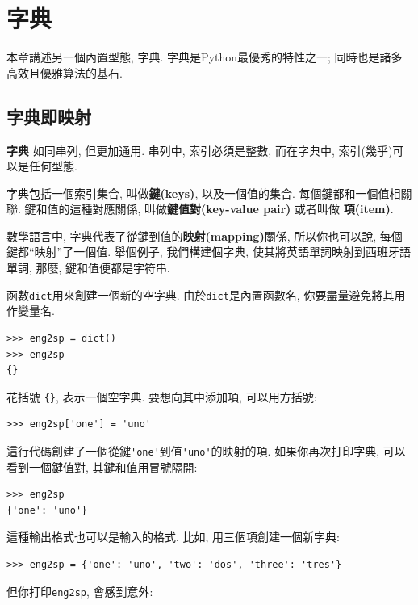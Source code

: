 \documentclass[10pt]{book}
\begin{document}
\chapter{字典}

本章講述另一個內置型態, 字典. 
字典是Python最優秀的特性之一; 同時也是諸多高效且優雅算法的基石. 


\section{字典即映射}


 {\bf 字典} 如同串列, 但更加通用. 串列中, 索引必須是整數, 
而在字典中, 索引(幾乎)可以是任何型態. 

字典包括一個索引集合, 叫做{\bf 鍵(keys)}, 以及一個值的集合. 
每個鍵都和一個值相關聯. 鍵和值的這種對應關係, 叫做{\bf 鍵值對(key-value pair)}
或者叫做 {\bf 項(item)}.  

數學語言中, 字典代表了從鍵到值的{\bf 映射(mapping)}關係, 
所以你也可以說, 每個鍵都``映射''了一個值. 
舉個例子, 我們構建個字典, 使其將英語單詞映射到西班牙語單詞, 
那麼, 鍵和值便都是字符串. 

函數{\tt dict}用來創建一個新的空字典. 
由於{\tt dict}是內置函數名, 你要盡量避免將其用作變量名. 

\begin{verbatim}
>>> eng2sp = dict()
>>> eng2sp
{}
\end{verbatim}

花括號 \verb"{}", 表示一個空字典. 
要想向其中添加項, 可以用方括號:

\begin{verbatim}
>>> eng2sp['one'] = 'uno'
\end{verbatim}
%
這行代碼創建了一個從鍵\verb"'one'"到值\verb"'uno'"的映射的項. 
如果你再次打印字典, 可以看到一個鍵值對, 其鍵和值用冒號隔開:

\begin{verbatim}
>>> eng2sp
{'one': 'uno'}
\end{verbatim}
%

這種輸出格式也可以是輸入的格式. 比如, 用三個項創建一個新字典:

\begin{verbatim}
>>> eng2sp = {'one': 'uno', 'two': 'dos', 'three': 'tres'}
\end{verbatim}
%
但你打印{\tt eng2sp}, 會感到意外:
\end{document}
